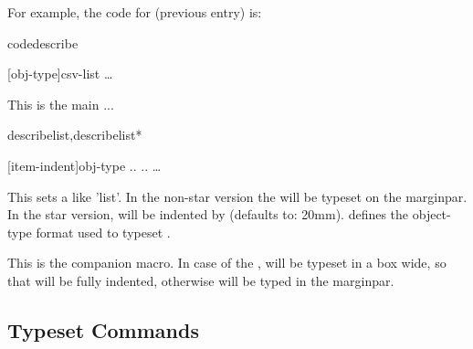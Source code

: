 \documentclass{article}
\begin{document}
For example, the code for   (previous entry) is:

\begin{codestore}[demoD]
\begin{codedescribe}[env,new=2023/05/01,update=2023/05/01,note={this is an example},update=2024/02/16]{codedescribe}
  \begin{codesyntax}
    \tsmacro{\begin{codedescribe}}[obj-type]{csv-list}
    \ldots
    \tsmacro{\end{codedescribe}}{}
  \end{codesyntax}
  This is the main ...
\end{codedescribe}
\end{codestore}  




\begin{codedescribe}[env]{describelist,describelist*}
  \begin{codesyntax}
\tsmacro{\begin{describelist}}[item-indent]{obj-type}
..
..
\ldots
\tsmacro{\end{describelist}}{}
  \end{codesyntax}
This sets a  like 'list'. In the non-star version the  will be typeset on the marginpar. In the star version,  will be indented by  (defaults to: 20mm).
 defines the object-type format used to typeset . 
\end{codedescribe}

\begin{codedescribe}[code]{\describe}
\begin{codesyntax}
\end{codesyntax}
This is the  companion macro. In case of the ,  will be typeset in a box  wide, so that  will be fully indented, otherwise  will be typed in the marginpar.
\end{codedescribe}


\subsection{Typeset Commands}\label{ts-commands}
\end{document}
